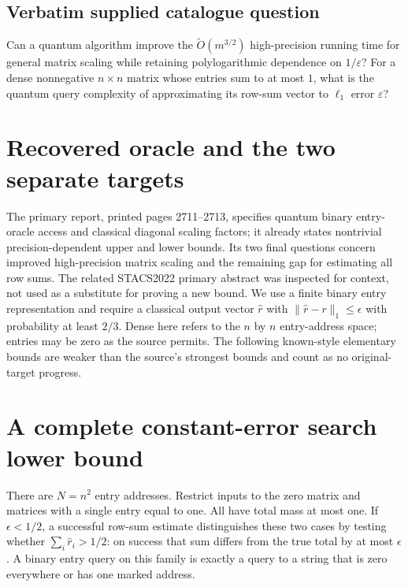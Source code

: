 \documentclass[11pt]{article}
\begin{document}
\subsection{Verbatim supplied catalogue question}
Can a quantum algorithm improve the $\widetilde O(m^{3/2})$ high-precision running time for general matrix scaling while retaining polylogarithmic dependence on $1/\varepsilon$? For a dense nonnegative $n\times n$ matrix whose entries sum to at most $1$, what is the quantum query complexity of approximating its row-sum vector to $\ell_1$ error $\varepsilon$?

\section{Recovered oracle and the two separate targets}
The primary report, printed pages 2711--2713, specifies quantum
binary entry-oracle access and classical diagonal scaling factors;
it already states nontrivial precision-dependent upper and lower
bounds. Its two final questions concern improved high-precision
matrix scaling and the remaining gap for estimating all row sums.
The related STACS2022 primary abstract was inspected for context,
not used as a substitute for proving a new bound. We use a
finite binary entry representation and require a classical output
vector $\widehat r$ with $\|\widehat r-r\|_1\le\epsilon$ with
probability at least $2/3$. Dense here refers to the $n$ by $n$
entry-address space; entries may be zero as the source permits.
The following known-style elementary bounds are weaker than the
source's strongest bounds and count as no original-target progress.

\section{A complete constant-error search lower bound}
There are $N=n^2$ entry addresses. Restrict inputs to the zero
matrix and matrices with a single entry equal to one. All have
total mass at most one. If $\epsilon<1/2$, a successful row-sum
estimate distinguishes these two cases by testing whether
$\sum_i\widehat r_i>1/2$: on success that sum differs from the
true total by at most $\epsilon$. A binary entry query on this
family is exactly a query to a string that is zero everywhere
or has one marked address.
\end{document}
